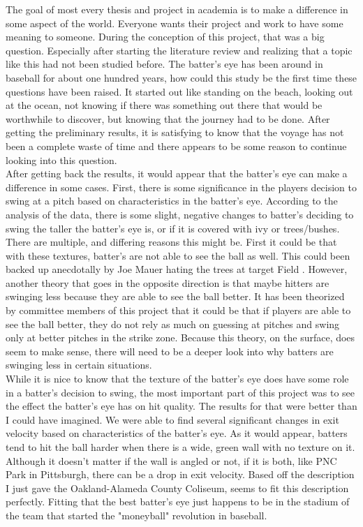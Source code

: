 \documentclass{article}
\begin{document}
\begin{doublespace}
The goal of most every thesis and project in academia is to make a difference in some aspect of the world. Everyone wants their project and work to have some meaning to someone. During the conception of this project, that was a big question. Especially after starting the literature review and realizing that a topic like this had not been studied before. The batter's eye has been around in baseball for about one hundred years, how could this study be the first time these questions have been raised. It started out like standing on the beach, looking out at the ocean, not knowing if there was something out there that would be worthwhile to discover, but knowing that the journey had to be done. After getting the preliminary results, it is satisfying to know that the voyage has not been a complete waste of time and there appears to be some reason to continue looking into this question. \\

After getting back the results, it would appear that the batter's eye can make a difference in some cases. First, there is some significance in the players decision to swing at a pitch based on characteristics in the batter's eye. According to the analysis of the data, there is some slight, negative changes to batter's deciding to swing the taller the batter's eye is, or if it is covered with ivy or trees/bushes. There are multiple, and differing reasons this might be. First it could be that with these textures, batter's are not able to see the ball as well. This could been backed up anecdotally by Joe Mauer hating the trees at target Field \citep{Gleeman}. However, another theory that goes in the opposite direction is that maybe hitters are swinging less because they are able to see the ball better. It has been theorized by committee members of this project that it could be that if players are able to see the ball better, they do not rely as much on guessing at pitches and swing only at better pitches in the strike zone. Because this theory, on the surface, does seem to make sense, there will need to be a deeper look into why batters are swinging less in certain situations. \\

While it is nice to know that the texture of the batter's eye does have some role in a batter's decision to swing, the most important part of this project was to see the effect the batter's eye has on hit quality. The results for that were better than I could have imagined. We were able to find several significant changes in exit velocity based on characteristics of the batter's eye. As it would appear, batters tend to hit the ball harder when there is a wide, green wall with no texture on it. Although it doesn't matter if the wall is angled or not, if it is both, like PNC Park in Pittsburgh, there can be a drop in exit velocity. Based off the description I just gave the Oakland-Alameda County Coliseum, seems to fit this description perfectly. Fitting that the best batter's eye just happens to be in the stadium of the team that started the "moneyball" revolution in baseball. \\


\end{doublespace}
\end{document}
